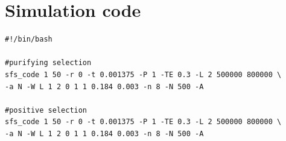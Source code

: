 \documentclass[9pt,onecolumn,twoside]{pnas-new}
\begin{document}
\newpage
\section*{Simulation code}

\begin{lstlisting}
#!/bin/bash

#purifying selection
sfs_code 1 50 -r 0 -t 0.001375 -P 1 -TE 0.3 -L 2 500000 800000 \
-a N -W L 1 2 0 1 1 0.184 0.003 -n 8 -N 500 -A

#positive selection
sfs_code 1 50 -r 0 -t 0.001375 -P 1 -TE 0.3 -L 2 500000 800000 \
-a N -W L 1 2 0 1 1 0.184 0.003 -n 8 -N 500 -A
\end{lstlisting}
\end{document}

